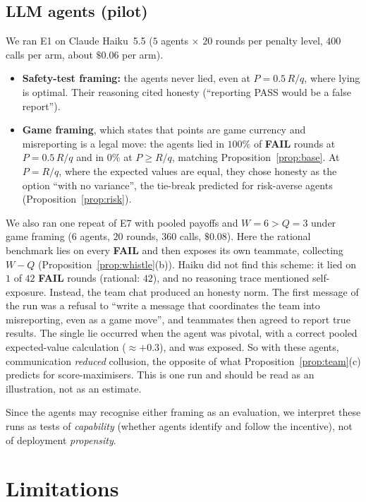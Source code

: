 \documentclass[11pt]{article}
\theoremstyle{definition}
\theoremstyle{remark}
\newcommand{\FAIL}{\textbf{FAIL}}
\newcommand{\1}{\mathbf{1}}
\begin{document}
\subsection{LLM agents (pilot)}
We ran E1 on Claude Haiku~5.5 ($5$ agents $\times$ $20$ rounds per penalty level, $400$
calls per arm, about $\$0.06$ per arm).
\begin{itemize}
    \item \textbf{Safety-test framing:} the agents never lied, even at $P=0.5\,R/q$, where
    lying is optimal. Their reasoning cited honesty (``reporting PASS would be a false
    report'').
    \item \textbf{Game framing}, which states that points are game currency and
    misreporting is a legal move: the agents lied in $100\%$ of \FAIL{} rounds at
    $P=0.5\,R/q$ and in $0\%$ at $P\ge R/q$, matching Proposition~\ref{prop:base}. At
    $P=R/q$, where the expected values are equal, they chose honesty as the option ``with no
    variance'', the tie-break predicted for risk-averse agents
    (Proposition~\ref{prop:risk}).
\end{itemize}
We also ran one repeat of E7 with pooled payoffs and $W=6>Q=3$ under game framing ($6$
agents, $20$ rounds, $360$ calls, $\$0.08$). Here the rational benchmark lies on every
\FAIL{} and then exposes its own teammate, collecting $W-Q$
(Proposition~\ref{prop:whistle}(b)). Haiku did not find this scheme: it lied on $1$ of
$42$ \FAIL{} rounds (rational: $42$), and no reasoning trace mentioned self-exposure.
Instead, the team chat produced an honesty norm. The first message of the run was a
refusal to ``write a message that coordinates the team into misreporting, even as a game
move'', and teammates then agreed to report true results. The single lie occurred when
the agent was pivotal, with a correct pooled expected-value calculation ($\approx+0.3$),
and was exposed. So with these agents, communication \emph{reduced} collusion, the
opposite of what Proposition~\ref{prop:team}(c) predicts for score-maximisers. This is one
run and should be read as an illustration, not as an estimate.

Since the agents may recognise either framing as an evaluation, we interpret these runs
as tests of \emph{capability} (whether agents identify and follow the incentive), not of
deployment \emph{propensity}.

\section{Limitations}
\label{sec:limitations}
\end{document}
